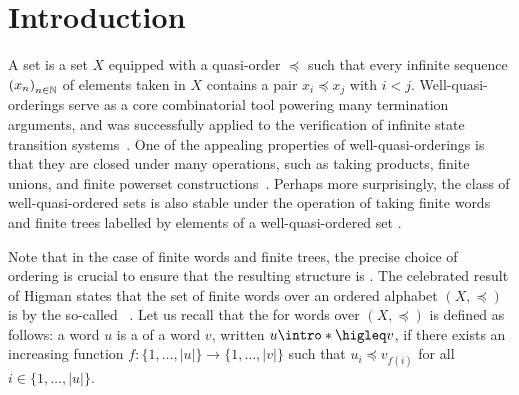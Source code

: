 \section{Introduction}
\label{introduction:sec}

\AP A  set is a set $X$ equipped with a quasi-order
$\preceq$ such that every infinite sequence $\seqof{x_n}$ of elements taken in
$X$ contains a pair $x_i \preceq x_j$ with $i < j$. Well-quasi-orderings serve
as a core combinatorial tool powering many termination arguments, and was
successfully applied to the verification of infinite state transition
systems~\cite{ABDU96,ABDU98}. One of the appealing properties of
well-quasi-orderings is that they are closed under many operations, such as
taking products, finite unions, and finite powerset
constructions~\cite{SCSC12}. Perhaps more surprisingly, the class of
well-quasi-ordered sets is also stable under the operation of taking finite
words and finite trees labelled by elements of a well-quasi-ordered set
\cite{HIG52,KRU72}.

\AP Note that in the case of finite words and finite trees, the precise choice
of ordering is crucial to ensure that the resulting structure is
. The celebrated result of Higman states that the set of
finite words over an ordered alphabet $(X, \preceq)$ is 
by the so-called ~\cite{HIG52}. Let us recall
that the  for words over $(X, \preceq)$ is defined as
follows: a word $u$ is a  of a word $v$, written $u
\intro*\higleq v$, if there exists an increasing function $f \colon \{1,
\ldots, |u|\} \to \{1, \ldots, |v|\}$ such that $u_i \preceq v_{f(i)}$ for all
$i \in \{1, \ldots, |u|\}$.


